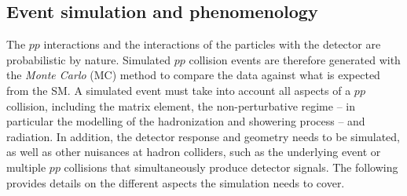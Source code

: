 \subsection{Event simulation and phenomenology}
\label{subsec:event-simulation}


The $pp$ interactions and the interactions of the particles with the detector are probabilistic by nature.
Simulated $pp$ collision events are therefore generated with the \emph{Monte Carlo} (MC) method to compare the data against what is expected from the SM.
A simulated event must take into account all aspects of a $pp$ collision, including the matrix element, the non-perturbative regime -- in particular the modelling of the hadronization and showering process -- and radiation. In addition, the detector response and geometry needs to be simulated, as well as other nuisances at hadron colliders, such as the underlying event or multiple $pp$ collisions that simultaneously produce detector signals.
The following provides details on the different aspects the simulation needs to cover.

